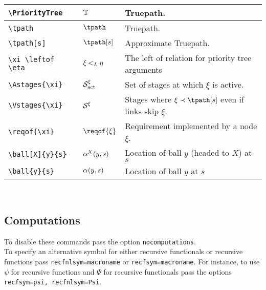 \documentclass[leqno,11pt]{amsart}
\begin{document}
\begin{xtabular}{l |  l | l}\toprule
	\verb=\PriorityTree=					& \( 	\mathbb{T}                   \)	& Truepath. \\ \midrule
	\verb=\tpath=					& \(  \tpath                   \)	& Truepath. \\ \midrule
	\verb=\tpath[s]=					& \( 	\tpath[s]                   \)	& Approximate Truepath. \\ \midrule
	\verb=\xi \leftof \eta =					& \( 	\xi \mathbin{<_L} \eta                   \)	& The left of relation for priority tree arguments \\ \midrule
	\verb=\Astages{\xi}=					& \( 	\mathcal{S}_{\text{act}}^{\xi}                   \)	& Set of stages at which \( \xi \) is active. \\ \midrule
	\verb=\Vstages{\xi}=					& \( 	\mathcal{S}^{\xi}                   \)	& Stages where \( \xi \subfun \tpath[s] \) even if links skip \( \xi \). \\ \midrule
	\verb=\reqof{\xi}=					& \( 	\reqof{\xi}                   \)	& Requirement implemented by a node \( \xi \). \\ \midrule
	\verb=\ball[X]{y}{s}=					& \( 	\ball[X]{y}{s}                  \)	& Location of ball \( y\) (headed to \( X \)) at \( s \)\\ \midrule
	\verb=\ball{y}{s}=					& \( 	\ball{y}{s}                  \)	& Location of ball \( y\)  at \( s \)\\ \bottomrule
	\end{xtabular}          \\


\subsection{Computations}
To disable these commands pass the option \verb=nocomputations=. \\  To specify an alternative symbol for either recursive functionals or recursive functions pass  \verb!recfnlsym=macroname! or \verb!recfsym=macroname!.  For instance, to use \( \psi \) for recursive functions and \( \Psi \) for recursive functionals pass the options \verb!recfsym=psi, recfnlsym=Psi!.  
\end{document}
